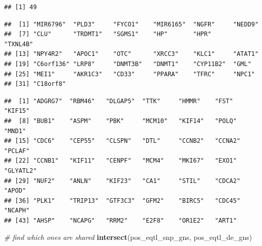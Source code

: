 \documentclass[]{article}
\newenvironment{Shaded}{\begin{snugshade}}{\end{snugshade}}
\newcommand{\KeywordTok}[1]{\textcolor[rgb]{0.13,0.29,0.53}{\textbf{#1}}}
\newcommand{\StringTok}[1]{\textcolor[rgb]{0.31,0.60,0.02}{#1}}
\newcommand{\CommentTok}[1]{\textcolor[rgb]{0.56,0.35,0.01}{\textit{#1}}}
\newcommand{\OperatorTok}[1]{\textcolor[rgb]{0.81,0.36,0.00}{\textbf{#1}}}
\newcommand{\NormalTok}[1]{#1}
\begin{document}
\begin{verbatim}
## [1] 49
\end{verbatim}

\begin{Shaded}
\end{Shaded}

\begin{verbatim}
##  [1] "MIR6796"  "PLD3"     "FYCO1"    "MIR6165"  "NGFR"     "NEDD9"   
##  [7] "CLU"      "TRDMT1"   "SGMS1"    "HP"       "HPR"      "TXNL4B"  
## [13] "NPY4R2"   "APOC1"    "OTC"      "XRCC3"    "KLC1"     "ATAT1"   
## [19] "C6orf136" "LRP8"     "DNMT3B"   "DNMT1"    "CYP11B2"  "GML"     
## [25] "MEI1"     "AKR1C3"   "CD33"     "PPARA"    "TFRC"     "NPC1"    
## [31] "C18orf8"
\end{verbatim}

\begin{Shaded}
\end{Shaded}

\begin{verbatim}
##  [1] "ADGRG7"  "RBM46"   "DLGAP5"  "TTK"     "HMMR"    "FST"     "KIF15"  
##  [8] "BUB1"    "ASPM"    "PBK"     "MCM10"   "KIF14"   "POLQ"    "MND1"   
## [15] "CDC6"    "CEP55"   "CLSPN"   "DTL"     "CCNB2"   "CCNA2"   "PCLAF"  
## [22] "CCNB1"   "KIF11"   "CENPF"   "MCM4"    "MKI67"   "EXO1"    "GLYATL2"
## [29] "NUF2"    "ANLN"    "KIF23"   "CA1"     "STIL"    "CDCA2"   "APOD"   
## [36] "PLK1"    "TRIP13"  "GTF3C3"  "GFM2"    "BIRC5"   "CDC45"   "NCAPH"  
## [43] "AHSP"    "NCAPG"   "RRM2"    "E2F8"    "OR1E2"   "ART1"
\end{verbatim}

\begin{Shaded}
\begin{Highlighting}[]
\CommentTok{# find which ones are shared}
\KeywordTok{intersect}\NormalTok{(pos_eqtl_snp_gns, pos_eqtl_de_gns)}
\end{Highlighting}
\end{Shaded}
\end{document}
